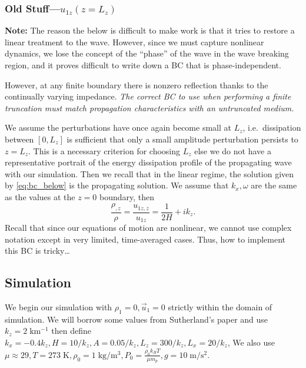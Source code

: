 \documentclass[11pt,
        usenames, %
        dvipsnames %
    ]{report}
\begin{document}
\subsubsection{Old Stuff---$u_{1z}(z = L_z)$}

\textbf{Note:} The reason the below is difficult to make work is that it tries
to restore a linear treatment to the wave. However, since we must capture
nonlinear dynamics, we lose the concept of the ``phase'' of the wave in the wave
breaking region, and it proves difficult to write down a BC that is
phase-independent.

However, at any finite boundary there is nonzero reflection thanks to the
continually varying impedance. \emph{The correct BC to use when performing a
finite truncation must match propagation characteristics with an untruncated
medium.}

We assume the perturbations have once again become small at $L_z$, i.e.\
dissipation between $[0, L_z]$ is sufficient that only a small amplitude
perturbation persists to $z = L_z$. This is a necessary criterion for choosing
$L_z$ else we do not have a representative portrait of the energy dissipation
profile of the propagating wave with our simulation. Then we recall that in the
linear regime, the solution given by \autoref{eq:bc_below} is the propagating
solution. We assume that $k_x, \omega$ are the same as the values at the $z = 0$
boundary, then
\begin{equation}
    \frac{\rho_{,z}}{\rho} = \frac{u_{1z, z}}{u_{1z}} = \frac{1}{2H} + ik_z.
        \label{eq:bc_above}
\end{equation}
Recall that since our equations of motion are nonlinear, we cannot use complex
notation except in very limited, time-averaged cases. Thus, how to implement
this BC is tricky\dots

\subsection{Simulation}

We begin our simulation with $\rho_1 = 0, \vec{u}_1 = 0$ strictly within the
domain of simulation. We will borrow some values from Sutherland's paper and use
$k_z = 2\;\mathrm{km^{-1}}$ then define $k_x = -0.4k_z, H = 10 / k_z, A = 0.05 /
k_z, L_z = 300 / k_z, L_x = 20 / k_z$, We also use $\mu \approx 29, T =
273\;\mathrm{K}, \rho_0 = 1\;\mathrm{kg/m^3}, P_0 = \frac{\rho_0 k_BT}{\mu m_p},
g = 10\;\mathrm{m/s^2}$.
\end{document}
